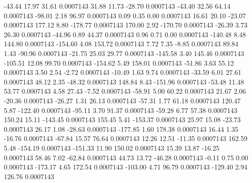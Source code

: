       -43.44       17.97       31.61     0.0007143
       31.88       11.73      -28.70     0.0007143
      -43.40       32.56       64.14     0.0007143
      -98.01        2.18       96.97     0.0007143
        0.09        0.35        0.00     0.0007143
       16.61       20.10      -23.07     0.0007143
      177.12        8.80     -178.77     0.0007143
      170.00        2.92     -170.70     0.0007143
      -26.39        3.73       26.30     0.0007143
      -44.96        0.89       44.37     0.0007143
        0.96        0.71        0.00     0.0007143
     -140.48        8.48      144.80     0.0007143
     -154.60        4.08      153.72     0.0007143
        7.72        7.35       -8.85     0.0007143
       89.84        1.43      -90.96     0.0007143
      -21.75       25.03       29.77     0.0007143
     -145.58        3.40      145.46     0.0007143
     -105.51       12.08       99.70     0.0007143
     -154.62        5.49      158.01     0.0007143
      -51.86        3.63       55.12     0.0007143
        3.50        2.54       -2.72     0.0007143
      -10.49        1.63        9.74     0.0007143
      -33.59        6.01       27.61     0.0007143
       48.12        2.35      -48.32     0.0007143
      148.84        8.43     -151.96     0.0007143
      -53.48       11.48       53.77     0.0007143
        4.58       27.43       -7.52     0.0007143
      -58.91        5.00       60.22     0.0007143
       21.67        2.06      -20.36     0.0007143
      -26.27        1.31       26.13     0.0007143
      -57.31        1.77       61.18     0.0007143
      120.47        5.87     -122.40     0.0007143
      -95.11        3.70       91.37     0.0007143
      -59.28        6.77       57.38     0.0007143
      150.24       15.11     -143.45     0.0007143
      155.45        5.41     -153.37     0.0007143
       25.97       15.08      -23.73     0.0007143
       26.17        1.08      -28.63     0.0007143
     -177.85        1.60      178.38     0.0007143
       16.44        1.35      -16.76     0.0007143
      -67.84       15.57       76.64     0.0007143
       12.26       12.51      -11.35     0.0007143
      162.59        5.48     -154.19     0.0007143
     -151.33       11.90      150.02     0.0007143
       15.39       13.87      -16.25     0.0007143
       58.46        7.02      -62.84     0.0007143
       44.73       13.72      -46.28     0.0007143
       -0.11        0.75        0.00     0.0007143
     -173.17        4.65      172.54     0.0007143
     -103.00        4.71       96.79     0.0007143
     -129.40        2.94      126.76     0.0007143
